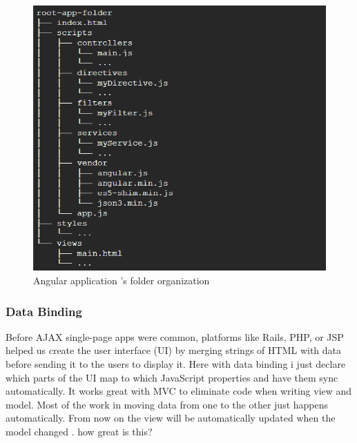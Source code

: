 \documentclass[14pt,a4paper]{extreport}
\begin{document}
		\begin{figure}
			\begin{center}
				\includegraphics[scale=0.5]{angular_organize.png}
				\caption{Angular application 's folder organization}
				\label{Angularfolder}
			\end{center}
		\end{figure}

			
			
			\subsubsection{Data Binding}
			Before AJAX single-page apps were common, platforms like Rails, PHP, or JSP helped us create the user interface (UI) by merging strings of HTML with data before sending it to the users to display it. Here with data binding i just declare which parts of the UI map to which JavaScript properties and have them sync automatically. It works great with MVC to eliminate code when writing view and model. Most of the work in moving data from one to the other just happens automatically. From now on the view will be automatically updated when the model changed . how great is this?
\end{document}
